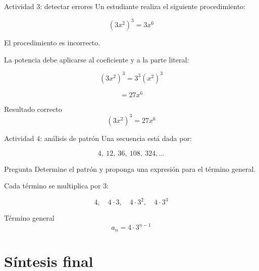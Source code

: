 \documentclass[handout,aspectratio=169]{beamer}
\begin{document}
	\begin{frame}{Actividad 3: detectar errores}
		Un estudiante realiza el siguiente procedimiento:
		
		\[
		(3x^2)^3=3x^6
		\]
		
		\pause
		
		\begin{alerta}
			El procedimiento es incorrecto.
		\end{alerta}
		
		\pause
		
		La potencia debe aplicarse al coeficiente y a la parte literal:
		
		\[
		(3x^2)^3=3^3(x^2)^3
		\]
		
		\pause
		
		\[
		=27x^6
		\]
		
		\pause
		
		\begin{block}{Resultado correcto}
			\[
			(3x^2)^3=27x^6
			\]
		\end{block}
	\end{frame}
	
	\begin{frame}{Actividad 4: análisis de patrón}
		Una secuencia está dada por:
		
		\[
		4,\ 12,\ 36,\ 108,\ 324,\ldots
		\]
		
		\pause
		
		\begin{block}{Pregunta}
			Determine el patrón y proponga una expresión para el término general.
		\end{block}
		
		\pause
		
		Cada término se multiplica por \(3\):
		
		\[
		4,\quad 4\cdot 3,\quad 4\cdot 3^2,\quad 4\cdot 3^3
		\]
		
		\pause
		
		\begin{block}{Término general}
			\[
			a_n=4\cdot 3^{n-1}
			\]
		\end{block}
	\end{frame}
	
	\section{Síntesis final}
	
\end{document}
